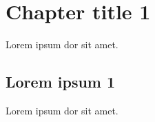 \documentclass[
    titlepage,numbers=noenddot,headinclude,
    footinclude=true,cleardoublepage=empty,
    dottedtoc,
    BCOR=5mm,paper=a4,fontsize=11pt,
]{scrreprt}
\title{\docTitle}
\author{\myName}
\begin{document}
\pagestyle{scrheadings}
\maketitle
\cleardoublepage

\tableofcontents
\thispagestyle{empty}
\cleardoublepage
\setcounter{page}{1} %

\chapter{Chapter title 1}
Lorem ipsum dor sit amet.%

\cleardoublepage

\section{Lorem ipsum 1}
Lorem ipsum dor sit amet.
\end{document}
